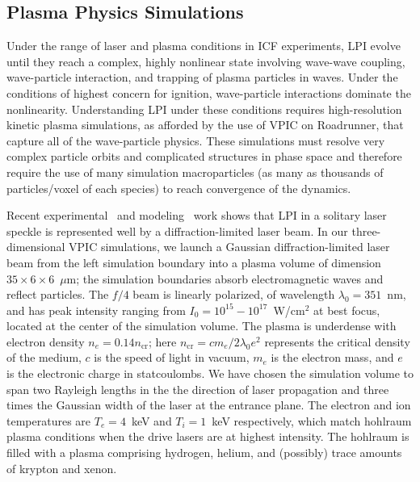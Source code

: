 \documentclass[10pt]{article}
\begin{document}
%
%
\subsection*{Plasma Physics Simulations}

Under the range of laser and plasma conditions in ICF experiments, LPI
evolve until they reach a complex, highly nonlinear state involving
wave-wave coupling, wave-particle interaction, and trapping of plasma
particles in waves.  Under the conditions of highest concern for
ignition, wave-particle interactions dominate the nonlinearity.
Understanding LPI under these conditions requires high-resolution
kinetic plasma simulations, as afforded by the use of VPIC on
Roadrunner, that capture all of the wave-particle physics.  These
simulations must resolve very complex particle orbits and complicated
structures in phase space and therefore require the use of many
simulation macroparticles (as many as thousands of particles/voxel of
each species) to reach convergence of the dynamics.~\cite{}

Recent experimental~\cite{} and modeling~\cite{} work shows that LPI
in a solitary laser speckle is represented well by a
diffraction-limited laser beam.  In our three-dimensional VPIC
simulations, we launch a Gaussian diffraction-limited laser beam from
the left simulation boundary into a plasma volume of dimension $35
\times 6 \times 6$~$\mu$m; the simulation boundaries absorb
electromagnetic waves and reflect particles.  The $f/4$ beam is
linearly polarized, of wavelength $\lambda_0 = 351$~nm, and has peak
intensity ranging from $I_0 = 10^{15} - 10^{17}$~W/cm$^2$ at best
focus, located at the center of the simulation volume.  The plasma is
underdense with electron density $n_e = 0.14 n_{\mathrm{cr}}$; here
$n_{\mathrm{cr}} = c m_e / 2 \lambda_0 e^2$ represents the critical
density of the medium, $c$ is the speed of light in vacuum, $m_e$ is
the electron mass, and $e$ is the electronic charge in statcoulombs.
We have chosen the simulation volume to span two Rayleigh lengths in
the the direction of laser propagation and three times the Gaussian
width of the laser at the entrance plane.  The electron and ion
temperatures are $T_e = 4$~keV and $T_i = 1$~keV respectively, which
match hohlraum plasma conditions when the drive lasers are at highest
intensity.  The hohlraum is filled with a plasma comprising hydrogen,
helium, and (possibly) trace amounts of krypton and xenon.
\end{document}
